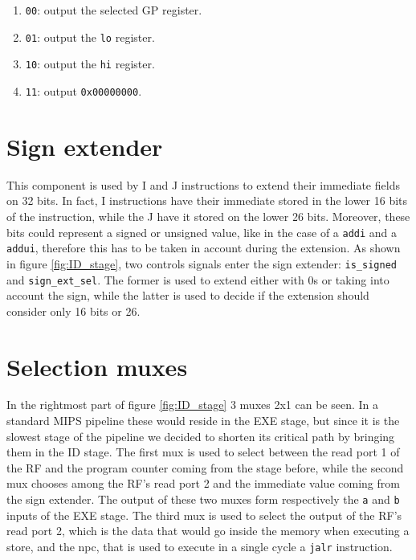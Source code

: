 \begin{enumerate}
    \item \verb|00|: output the selected GP register.
    \item \verb|01|: output the \verb|lo| register.
    \item \verb|10|: output the \verb|hi| register.
    \item \verb|11|: output \verb|0x00000000|.
\end{enumerate}

\section{Sign extender}

This component is used by I and J instructions to extend their immediate fields on 32 bits. In fact, I instructions have their immediate stored in the lower 16 bits of the instruction,
while the J have it stored on the lower 26 bits. Moreover, these bits could represent a signed or unsigned value, like in the case of a \verb|addi| and a \verb|addui|, therefore this
has to be taken in account during the extension. As shown in figure \ref{fig:ID_stage}, two controls signals enter the sign extender: \verb|is_signed| and \verb|sign_ext_sel|. The former
is used to extend either with 0s or taking into account the sign, while the latter is used to decide if the extension should consider only 16 bits or 26.

\section{Selection muxes}

In the rightmost part of figure \ref{fig:ID_stage} 3 muxes 2x1 can be seen. In a standard MIPS pipeline these would reside in the EXE stage, but since it is the slowest stage of the pipeline
we decided to shorten its critical path by bringing them in the ID stage. The first mux is used to select between the read port 1 of the RF and the program counter coming from the stage before,
while the second mux chooses among the RF's read port 2 and the immediate value coming from the sign extender. The output of these two muxes form respectively the \verb|a| and \verb|b| inputs
of the EXE stage. The third mux is used to select the output of the RF's read port 2, which is the data that would go inside the memory when executing a store, and the npc, that is used to execute
in a single cycle a \verb|jalr| instruction.